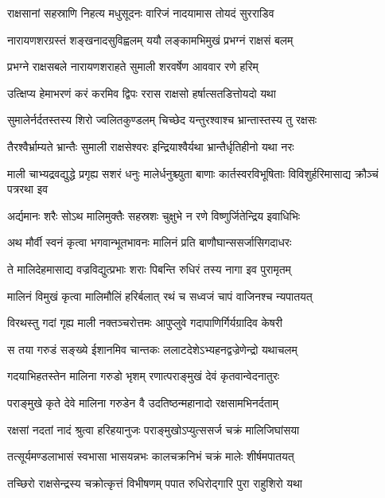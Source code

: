 \twolineshloka
{राक्षसानां सहस्राणि निहत्य मधुसूदनः}
{वारिजं नादयामास तोयदं सुरराडिव} %

\twolineshloka
{नारायणशरग्रस्तं शङ्खनादसुविह्वलम्}
{ययौ लङ्कामभिमुखं प्रभग्नं राक्षसं बलम्} %

\twolineshloka
{प्रभग्ने राक्षसबले नारायणशराहते}
{सुमाली शरवर्षेण आववार रणे हरिम्} %

\twolineshloka
{उत्क्षिप्य हेमाभरणं करं करमिव द्विपः}
{ररास राक्षसो हर्षात्सतडित्तोयदो यथा} %

\twolineshloka
{सुमालेर्नर्दतस्तस्य शिरो ज्वलितकुण्डलम्}
{चिच्छेद यन्तुरश्वाश्च भ्रान्तास्तस्य तु रक्षसः} %

\twolineshloka
{तैरश्वैर्भ्राम्यते भ्रान्तैः सुमाली राक्षसेश्वरः}
{इन्द्रियाश्वैर्यथा भ्रान्तैर्धृतिहीनो यथा नरः} %

\threelineshloka
{माली चाभ्यद्रवद्युद्धे प्रगृह्य सशरं धनुः}
{मालेर्धनुश्च्युता बाणाः कार्तस्वरविभूषिताः}
{विविशुर्हरिमासाद्य क्रौञ्चं पत्ररथा इव} %

\twolineshloka
{अर्द्यमानः शरैः सोऽथ मालिमुक्तैः सहस्रशः}
{चुक्षुभे न रणे विष्णुर्जितेन्द्रिय इवाधिभिः} %

\twolineshloka
{अथ मौर्वी स्वनं कृत्वा भगवान्भूतभावनः}
{मालिनं प्रति बाणौघान्ससर्जासिगदाधरः} %

\twolineshloka
{ते मालिदेहमासाद्य वज्रविद्युत्प्रभाः शराः}
{पिबन्ति रुधिरं तस्य नागा इव पुरामृतम्} %

\twolineshloka
{मालिनं विमुखं कृत्वा मालिमौलिं हरिर्बलात्}
{रथं च सध्वजं चापं वाजिनश्च न्यपातयत्} %

\twolineshloka
{विरथस्तु गदां गृह्य माली नक्तञ्चरोत्तमः}
{आपुप्लुवे गदापाणिर्गिर्यग्रादिव केषरी} %

\twolineshloka
{स तया गरुडं सङ्ख्ये ईशानमिव चान्तकः}
{ललाटदेशेऽभ्यहनद्वज्रेणेन्द्रो यथाचलम्} %

\twolineshloka
{गदयाभिहतस्तेन मालिना गरुडो भृशम्}
{रणात्पराङ्मुखं देवं कृतवान्वेदनातुरः} %

\twolineshloka
{पराङ्मुखे कृते देवे मालिना गरुडेन वै}
{उदतिष्ठन्महानादो रक्षसामभिनर्दताम्} %

\twolineshloka
{रक्षसां नदतां नादं श्रुत्वा हरिहयानुजः}
{पराङ्मुखोऽप्युत्ससर्ज चक्रं मालिजिघांसया} %

\twolineshloka
{तत्सूर्यमण्डलाभासं स्वभासा भासयन्नभः}
{कालचक्रनिभं चक्रं मालेः शीर्षमपातयत्} %

\twolineshloka
{तच्छिरो राक्षसेन्द्रस्य चक्रोत्कृत्तं विभीषणम्}
{पपात रुधिरोद्गारि पुरा राहुशिरो यथा} %

